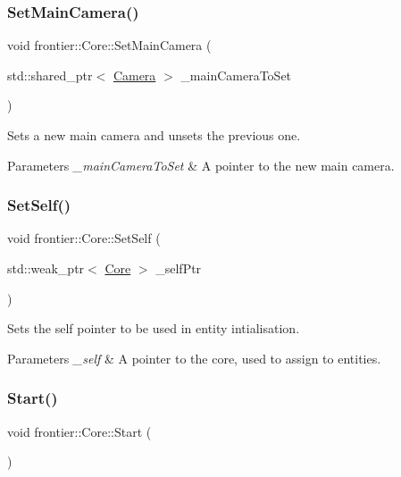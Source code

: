\subsubsection{\texorpdfstring{Set\+Main\+Camera()}{SetMainCamera()}}
{\footnotesize\ttfamily void frontier\+::\+Core\+::\+Set\+Main\+Camera (\begin{DoxyParamCaption}\item[{std\+::shared\+\_\+ptr$<$ \hyperlink{classfrontier_1_1_camera}{Camera} $>$}]{\+\_\+main\+Camera\+To\+Set }\end{DoxyParamCaption})}



Sets a new main camera and unsets the previous one. 


\begin{DoxyParams}{Parameters}
{\em \+\_\+main\+Camera\+To\+Set} & A pointer to the new main camera. \\
\hline
\end{DoxyParams}
\mbox{\label{classfrontier_1_1_core_a92669a2d7754db9bcf3ff600f54952ae}} 
\subsubsection{\texorpdfstring{Set\+Self()}{SetSelf()}}
{\footnotesize\ttfamily void frontier\+::\+Core\+::\+Set\+Self (\begin{DoxyParamCaption}\item[{std\+::weak\+\_\+ptr$<$ \hyperlink{classfrontier_1_1_core}{Core} $>$}]{\+\_\+self\+Ptr }\end{DoxyParamCaption})}



Sets the self pointer to be used in entity intialisation. 


\begin{DoxyParams}{Parameters}
{\em \+\_\+self} & A pointer to the core, used to assign to entities. \\
\hline
\end{DoxyParams}
\mbox{\label{classfrontier_1_1_core_a184b56e6f852d9670168111e5e1a1bc2}} 
\subsubsection{\texorpdfstring{Start()}{Start()}}
{\footnotesize\ttfamily void frontier\+::\+Core\+::\+Start (\begin{DoxyParamCaption}{ }\end{DoxyParamCaption})}



